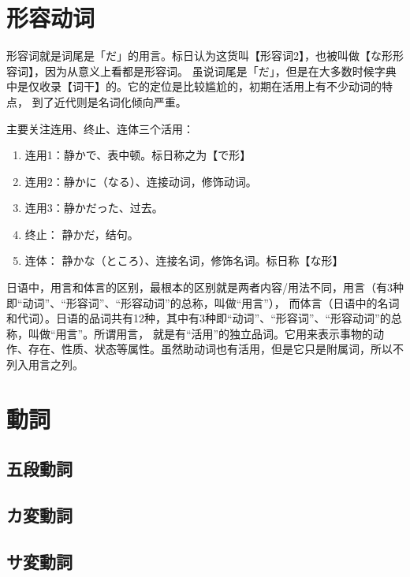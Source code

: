 \section{形容动词}

形容词就是词尾是「だ」的用言。标日认为这货叫【形容词2】，也被叫做【な形形容词】，因为从意义上看都是形容词。
虽说词尾是「だ」，但是在大多数时候字典中是仅收录【词干】的。它的定位是比较尴尬的，初期在活用上有不少动词的特点，
到了近代则是名词化倾向严重。


主要关注连用、终止、连体三个活用：
\begin{enumerate}
    \item 连用1：静かで、表中顿。标日称之为【で形】
    \item 连用2：静かに（なる）、连接动词，修饰动词。
    \item 连用3：静かだった、过去。
    \item 终止： 静かだ，结句。
    \item 连体： 静かな（ところ）、连接名词，修饰名词。标日称【な形】
\end{enumerate}

日语中，用言和体言的区别，最根本的区别就是两者内容/用法不同，用言（有3种即“动词”、“形容词”、“形容动词”的总称，叫做“用言”），
而体言（日语中的名词和代词）。日语的品词共有12种，其中有3种即“动词”、“形容词”、“形容动词”的总称，叫做“用言”。所谓用言，
就是有“活用”的独立品词。它用来表示事物的动作、存在、性质、状态等属性。虽然助动词也有活用，但是它只是附属词，所以不列入用言之列。

\section{動詞}

\newpage

\subsection{五段動詞}

\newpage

\subsection{カ変動詞}

\newpage

\subsection{サ変動詞}

\newpage

